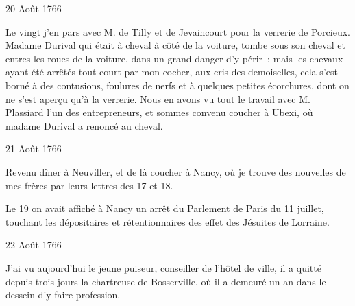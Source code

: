                     \begin{diary}{20 Août 1766}{}
                        
                        
                           Le vingt j'en pars avec M.
                           de Tilly et
                           de Jevaincourt pour
                              la verrerie de
                           Porcieux.
                           Madame Durival qui était à cheval à côté
                           de la voiture, tombe sous son cheval et entres
                           les roues de la voiture, dans un grand danger
                           d'y périr : mais les chevaux ayant été arrêtés
                           tout court par mon cocher, aux cris des
                           demoiselles, cela s'est borné à des contusions, foulures de nerfs et à quelques petites
                           écorchures, dont on ne s'est aperçu qu'à
                           la verrerie. Nous en avons vu tout le
                           travail avec M. Plassiard l'un
                           des entrepreneurs,
                           et sommes convenu coucher à Ubexi, où madame
                              Durival a renoncé au cheval. \bigskip
        
        
                     \end{diary}

                     \begin{diary}{21 Août 1766}{}
                        
                         Revenu dîner à Neuviller, et de là coucher
                           à Nancy, où je trouve des
                           nouvelles de
                           mes
                              frères par leurs lettres des 17 et 18. \bigskip
        
        
                        
                           Le 19 on avait affiché à Nancy un arrêt
                           du Parlement de Paris du
                              11 juillet, touchant
                           les dépositaires et rétentionnaires des effet
                           des Jésuites de Lorraine. \bigskip
        
        
                     \end{diary}

                     \begin{diary}{22 Août 1766}{}
                        
                         J'ai vu aujourd'hui le jeune puiseur, conseiller de
                           l'hôtel de ville, il a quitté
                           depuis trois jours
                           la chartreuse de
                              Bosserville, où il a demeuré
                           un an dans le dessein d'y faire profession. \bigskip
        
        
                     \end{diary}


